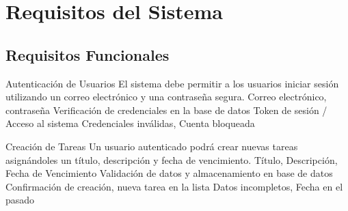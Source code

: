 \chapter{Requisitos del Sistema}

\section{Requisitos Funcionales}

\begin{requirement}{Autenticación de Usuarios}
    \reqbody
        {El sistema debe permitir a los usuarios iniciar sesión utilizando un correo electrónico y una contraseña segura.}
        {Correo electrónico, contraseña}
        {Verificación de credenciales en la base de datos}
        {Token de sesión / Acceso al sistema}
        {Credenciales inválidas, Cuenta bloqueada}
\end{requirement}

\begin{requirement}{Creación de Tareas}
    \reqbody
        {Un usuario autenticado podrá crear nuevas tareas asignándoles un título, descripción y fecha de vencimiento.}
        {Título, Descripción, Fecha de Vencimiento}
        {Validación de datos y almacenamiento en base de datos}
        {Confirmación de creación, nueva tarea en la lista}
        {Datos incompletos, Fecha en el pasado}
\end{requirement}
